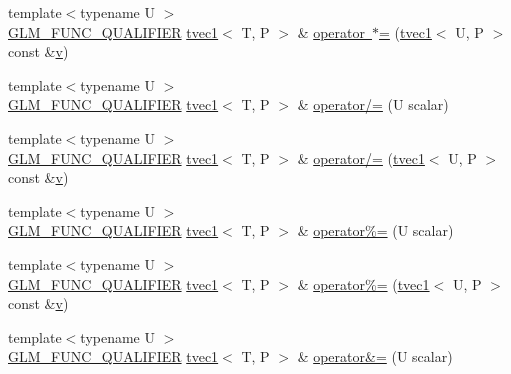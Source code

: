 \begin{DoxyCompactItemize}
{\footnotesize template$<$typename U $>$ }\\\mbox{\hyperlink{setup_8hpp_a33fdea6f91c5f834105f7415e2a64407}{G\+L\+M\+\_\+\+F\+U\+N\+C\+\_\+\+Q\+U\+A\+L\+I\+F\+I\+ER}} \mbox{\hyperlink{structglm_1_1tvec1}{tvec1}}$<$ T, P $>$ \& \mbox{\hyperlink{structglm_1_1tvec1_a44a1f4ca2a947b65ba347bdea6d314ca}{operator $\ast$=}} (\mbox{\hyperlink{structglm_1_1tvec1}{tvec1}}$<$ U, P $>$ const \&\mbox{\hyperlink{glad_8h_a14cfbe2fc2234f5504618905b69d1e06}{v}})
\item 
{\footnotesize template$<$typename U $>$ }\\\mbox{\hyperlink{setup_8hpp_a33fdea6f91c5f834105f7415e2a64407}{G\+L\+M\+\_\+\+F\+U\+N\+C\+\_\+\+Q\+U\+A\+L\+I\+F\+I\+ER}} \mbox{\hyperlink{structglm_1_1tvec1}{tvec1}}$<$ T, P $>$ \& \mbox{\hyperlink{structglm_1_1tvec1_a989f51843859422e4d4d5fe05f250a62}{operator/=}} (U scalar)
\item 
{\footnotesize template$<$typename U $>$ }\\\mbox{\hyperlink{setup_8hpp_a33fdea6f91c5f834105f7415e2a64407}{G\+L\+M\+\_\+\+F\+U\+N\+C\+\_\+\+Q\+U\+A\+L\+I\+F\+I\+ER}} \mbox{\hyperlink{structglm_1_1tvec1}{tvec1}}$<$ T, P $>$ \& \mbox{\hyperlink{structglm_1_1tvec1_ad0331e0db142714cc1169da2d209eb01}{operator/=}} (\mbox{\hyperlink{structglm_1_1tvec1}{tvec1}}$<$ U, P $>$ const \&\mbox{\hyperlink{glad_8h_a14cfbe2fc2234f5504618905b69d1e06}{v}})
\item 
{\footnotesize template$<$typename U $>$ }\\\mbox{\hyperlink{setup_8hpp_a33fdea6f91c5f834105f7415e2a64407}{G\+L\+M\+\_\+\+F\+U\+N\+C\+\_\+\+Q\+U\+A\+L\+I\+F\+I\+ER}} \mbox{\hyperlink{structglm_1_1tvec1}{tvec1}}$<$ T, P $>$ \& \mbox{\hyperlink{structglm_1_1tvec1_a35dc2d42d4af7b06ce9efcf2280cfffc}{operator\%=}} (U scalar)
\item 
{\footnotesize template$<$typename U $>$ }\\\mbox{\hyperlink{setup_8hpp_a33fdea6f91c5f834105f7415e2a64407}{G\+L\+M\+\_\+\+F\+U\+N\+C\+\_\+\+Q\+U\+A\+L\+I\+F\+I\+ER}} \mbox{\hyperlink{structglm_1_1tvec1}{tvec1}}$<$ T, P $>$ \& \mbox{\hyperlink{structglm_1_1tvec1_aa8eca5faec8c0bef17a99524d60bf89d}{operator\%=}} (\mbox{\hyperlink{structglm_1_1tvec1}{tvec1}}$<$ U, P $>$ const \&\mbox{\hyperlink{glad_8h_a14cfbe2fc2234f5504618905b69d1e06}{v}})
\item 
{\footnotesize template$<$typename U $>$ }\\\mbox{\hyperlink{setup_8hpp_a33fdea6f91c5f834105f7415e2a64407}{G\+L\+M\+\_\+\+F\+U\+N\+C\+\_\+\+Q\+U\+A\+L\+I\+F\+I\+ER}} \mbox{\hyperlink{structglm_1_1tvec1}{tvec1}}$<$ T, P $>$ \& \mbox{\hyperlink{structglm_1_1tvec1_af326237bd114ffbf1a94eb17b96df7d1}{operator\&=}} (U scalar)

\end{DoxyCompactItemize}
